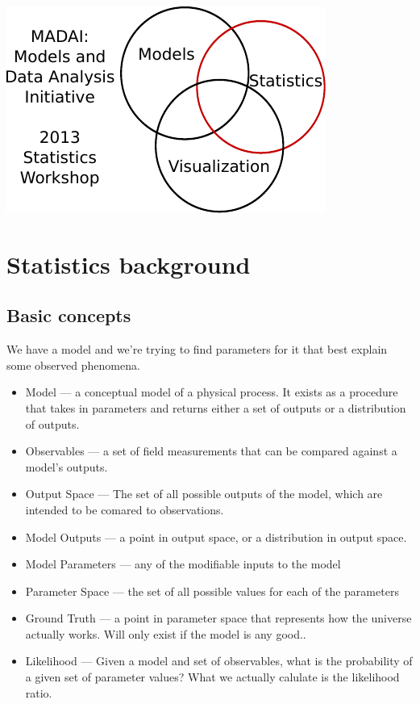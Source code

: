 \documentclass{article}
\begin{document}
\begin{center}
\includegraphics{figures/MADAI_2013_Stats_Workshop.pdf}
\end{center}

\section{Statistics background}

\subsection{Basic concepts}

We have a model and we're trying to find parameters for it that best
explain some observed phenomena.

\begin{itemize}

\item Model — a conceptual model of a physical process.  It exists as
  a procedure that takes in parameters and returns either a set of
  outputs or a distribution of outputs.

\item Observables — a set of field measurements that can be compared
  against a model's outputs.

\item Output Space — The set of all possible outputs of the model,
  which are intended to be comared to observations.

\item Model Outputs — a point in output space, or a distribution in
  output space.

\item Model Parameters — any of the modifiable inputs to the model

\item Parameter Space — the set of all possible values for each of the
  parameters

\item Ground Truth — a point in parameter space that represents how
  the universe actually works.  Will only exist if the model is any
  good..

\item Likelihood — Given a model and set of observables, what is the
  probability of a given set of parameter values?  What we actually
  calulate is the likelihood ratio.

\end{itemize}
\end{document}
